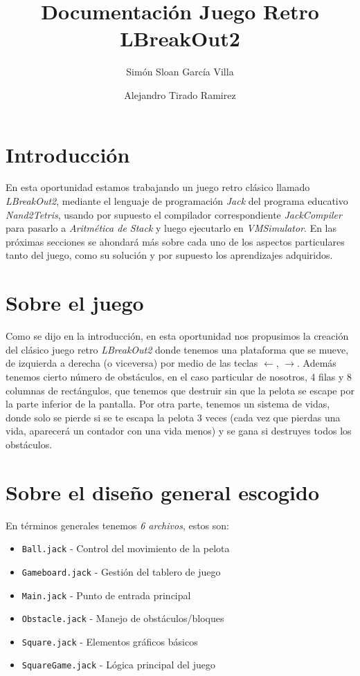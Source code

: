 \documentclass{report}
\title{Documentación Juego Retro LBreakOut2}
\author{Simón Sloan García Villa \and Alejandro Tirado Ramirez}
\begin{document}
	\maketitle
	\tableofcontents
	
	\section{Introducción}
	En esta oportunidad estamos trabajando un juego retro clásico llamado \emph{LBreakOut2}, mediante el lenguaje de programación \emph{Jack} del programa educativo \emph{Nand2Tetris}, usando por supuesto el compilador correspondiente \emph{JackCompiler} para pasarlo a \emph{Aritmética de Stack} y luego ejecutarlo en \emph{VMSimulator}. En las próximas secciones se ahondará más sobre cada uno de los aspectos particulares tanto del juego, como su solución y por supuesto los aprendizajes adquiridos.
	
	\section{Sobre el juego}
	Como se dijo en la introducción, en esta oportunidad nos propusimos la creación del clásico juego retro \emph{LBreakOut2} donde tenemos una plataforma que se mueve, de izquierda a derecha (o viceversa) por medio de las teclas $\leftarrow$, $\rightarrow$. Además tenemos cierto número de obstáculos, en el caso particular de nosotros, 4 filas y 8 columnas de rectángulos, que tenemos que destruir sin que la pelota se escape por la parte inferior de la pantalla. Por otra parte, tenemos un sistema de vidas, donde solo se pierde si se te escapa la pelota 3 veces (cada vez que pierdas una vida, aparecerá un contador con una vida menos) y se gana si destruyes todos los obstáculos.
	
	\section{Sobre el diseño general escogido}
	En términos generales tenemos \emph{6 archivos}, estos son: 
	\begin{itemize}
		\item \texttt{Ball.jack} - Control del movimiento de la pelota
		\item \texttt{Gameboard.jack} - Gestión del tablero de juego
		\item \texttt{Main.jack} - Punto de entrada principal
		\item \texttt{Obstacle.jack} - Manejo de obstáculos/bloques
		\item \texttt{Square.jack} - Elementos gráficos básicos
		\item \texttt{SquareGame.jack} - Lógica principal del juego
	\end{itemize}
	
\end{document}
